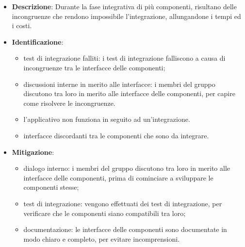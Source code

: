 \label{risk:interfacce incoerenti}
\begin{itemize}
	\item \textbf{Descrizione}:
	      Durante la fase integrativa di più componenti, risultano delle
	      incongruenze che rendono impossibile l'integrazione, allungandone i
	      tempi ed i costi.
	\item \textbf{Identificazione}:
	      \begin{itemize}
		      \item test di integrazione falliti: i test di integrazione
		            falliscono a causa di incongruenze tra le interfacce delle
		            componenti;

		      \item discussioni interne in merito alle interfacce: i membri
		            del gruppo discutono tra loro in merito alle interfacce
		            delle componenti, per capire come risolvere le incongruenze.

		      \item l'applicativo non funziona in seguito ad un'integrazione.

		      \item interfacce discordanti tra le componenti che sono da
		            integrare.
	      \end{itemize}
	\item \textbf{Mitigazione}:
	      \begin{itemize}
		      \item dialogo interno: i membri del gruppo discutono tra loro
		            in merito alle interfacce delle componenti, prima di
		            cominciare a sviluppare le componenti stesse;

		      \item test di integrazione: vengono effettuati dei test di
		            integrazione, per verificare che le componenti siano
		            compatibili tra loro;

		      \item documentazione: le interfacce delle componenti sono
		            documentate in modo chiaro e completo, per evitare
		            incomprensioni.
	      \end{itemize}
\end{itemize}

